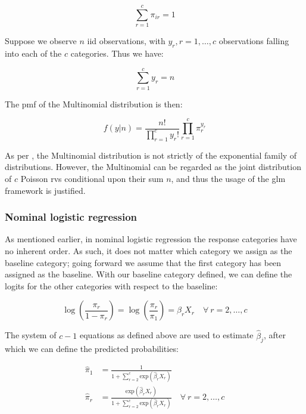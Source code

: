 \documentclass{report}
\begin{document}
\begin{equation}\label{eq:glm-multinom-prob-constraint}
    \sum_{r=1}^c \pi_{ir} = 1
\end{equation}

Suppose we observe $n$ \gls{iid} observations, with $y_r, r = 1, \dots, c$ observations falling into each of the $c$ categories. Thus we have:

\begin{equation}\label{eq:glm-multinom-y-equals-n}
    \sum_{r=1}^c y_r = n
\end{equation}

The \gls{pmf} of the Multinomial distribution is then:

\begin{equation}\label{eq:glm-multinom-pmf}
    f(y | n) = \frac{n!}{\prod_{r=1}^c y_r!} \prod_{r=1}^c \pi_r^{y_r}
\end{equation}

As per \cite[Chapter~8.2]{dobson_introduction_2018}, the Multinomial distribution is not strictly of the exponential family of distributions. However, the Multinomial can be regarded as the joint distribution of $c$ Poisson \glspl{rv} conditional upon their sum $n$, and thus the usage of the \gls{glm} framework is justified. 

\subsubsection{Nominal logistic regression}

As mentioned earlier, in nominal logistic regression the response categories have no inherent order. As such, it does not matter which category we assign as the baseline category; going forward we assume that the first category has been assigned as the baseline. With our baseline category defined, we can define the logits for the other categories with respect to the baseline:

\begin{equation}\label{eq:glm-nominal-logits}
    \log\left(\frac{\pi_r}{1 - \pi_r}\right) = \log\left(\frac{\pi_r}{\pi_1}\right) = \beta_r X_r \quad \forall \: r = 2, \dots, c
\end{equation}

The system of $c - 1$ equations as defined above are used to estimate $\hat{\beta}_j$, after which we can define the predicted probabilities:

\begin{equation}\label{eq:glm-nominal-pred-prob}
    \begin{aligned}
        \hat{\pi}_1 &= \frac{1}{1 + \sum_{r=2}^c \text{exp}\left(\hat{\beta}_r X_r\right)} \\
        \hat{\pi}_r &= \frac{\text{exp}\left(\hat{\beta}_r X_r\right)}{1 + \sum_{r=2}^c \text{exp}\left(\hat{\beta}_r X_r\right)} \quad \forall \: r = 2, \dots, c \\
    \end{aligned}
\end{equation}
\end{document}
